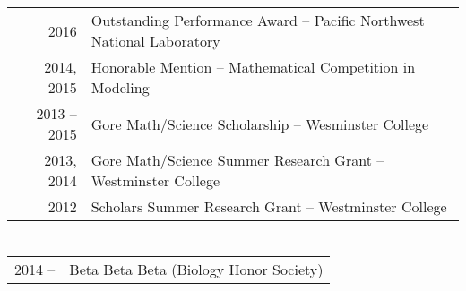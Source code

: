 \documentclass[a4paper,10pt]{article}
\begin{document}
\section{\color{linkcolour}{Awards and Accolades}}
\begin{tabular}{rl}
2016 & Outstanding Performance Award -- Pacific Northwest National Laboratory
\\ 2014, 2015 & Honorable Mention -- Mathematical Competition in Modeling
\\ 2013 -- 2015&  Gore Math/Science Scholarship -- Wesminster College
\\ 2013, 2014& Gore Math/Science Summer Research Grant -- Westminster College
\\ 2012 & Scholars Summer Research Grant -- Westminster College
\end{tabular}

\section{\color{linkcolour}{Professional Affiliations}}
\begin{tabular}{rl}
2014 -- & Beta Beta Beta (Biology Honor Society) \\
\end{tabular}
\end{document}
